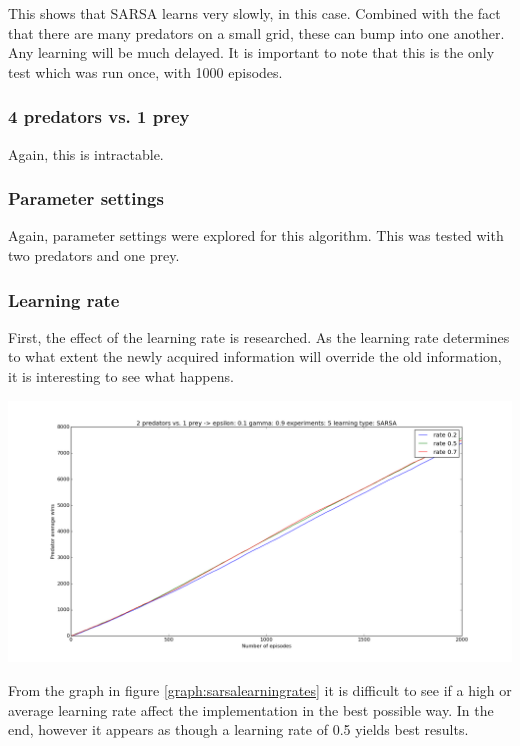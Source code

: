 This shows that SARSA learns very slowly, in this case. Combined with the fact that there are many predators on a small grid, these can bump into one another. Any learning will be much delayed. It is important to note that this is the only test which was run once, with 1000 episodes.

\subsubsection{4 predators vs. 1 prey}
Again, this is intractable. 

\subsubsection{Parameter settings}
Again, parameter settings were explored for this algorithm. This was tested with two predators and one prey.

\subsubsection{Learning rate}
First, the effect of the learning rate is researched. As the learning rate determines to what extent the newly acquired information will override the old information, it is interesting to see what happens. 

\begin{center}
	\includegraphics[scale=0.3]{2_predators_learning_rate_SARSA}
	\label{graph:sarsalearningrates}
\end{center}

From the graph in figure \ref{graph:sarsalearningrates} it is difficult to see if a high or average learning rate affect the implementation in the best possible way. In the end, however it appears as though a learning rate of 0.5 yields best results.


